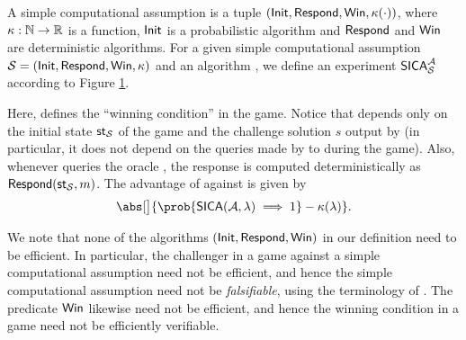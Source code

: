 \begin{definition}\label{def:simple}
  A simple computational assumption is a tuple \((\mathsf{Init},\mathsf{Respond},\mathsf{Win},\kappa(\cdot))\),
  where \(\kappa : \mathbb{N} \to \mathbb{R}\) is a function,
  \(\mathsf{Init}\) is a probabilistic algorithm
  and \(\mathsf{Respond}\) and \(\mathsf{Win}\) are deterministic algorithms.
  For a given simple computational assumption \(\mathcal{S} = (\mathsf{Init},\mathsf{Respond},\mathsf{Win},\kappa)\)
  and an algorithm \advA, we define an experiment \(\mathsf{SICA}_{\mathcal{S}}^{\mathcal{A}}\)
  according to Figure \ref{fig:simple}.

  Here, \Win{} defines the ``winning condition'' in the game.
  Notice that \Win{} depends only on the initial state \(\mathsf{st}_{\mathcal{S}}\)
  of the game and the challenge solution \(s\) output by \advA
  (in particular, it does not depend on the queries made by \advA
  to \oracle during the game).
  Also, whenever \advA queries the oracle \oracle,
  the response is computed deterministically as \(\mathsf{Respond}(\mathsf{st}_{\mathcal{S}},m)\).
  The advantage of \advA{} against \Simple is given by
  \begin{equation}
    \abs[\big]{\prob{\SICA(\advA,\lambda) \implies 1} - \kappa(\lambda)}.
  \end{equation}
\end{definition}

\begin{figure}
  \begin{pchstack}[center,space=0.5cm]
  \end{pchstack}\caption{}\label{fig:simple}
\end{figure}


\begin{remark}
  We note that none of the algorithms \((\mathsf{Init},\mathsf{Respond},\mathsf{Win})\)
  in our definition need to be efficient.
  In particular, the challenger in a \SICA
  game against a simple computational assumption
  need not be efficient,
  and hence the simple computational assumption need not be \emph{falsifiable},
  using the terminology of .
  The predicate \(\mathsf{Win}\) likewise need not be efficient,
  and hence the winning condition in a \SICA game
  need not be efficiently verifiable.
\end{remark}

